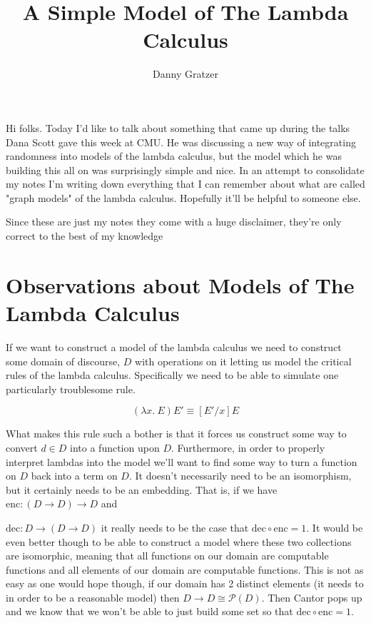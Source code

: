 \documentclass{amsart}
\title{A Simple Model of The Lambda Calculus}
\author{Danny Gratzer}
\newcommand{\enc}{\text{enc}}
\newcommand{\dec}{\text{dec}}
\begin{document}
\maketitle


Hi folks. Today I'd like to talk about something that came up during
the talks Dana Scott gave this week at CMU. He was discussing a new
way of integrating randomness into models of the lambda calculus, but
the model which he was building this all on was surprisingly simple
and nice. In an attempt to consolidate my notes I'm writing down
everything that I can remember about what are called "graph models" of
the lambda calculus. Hopefully it'll be helpful to someone
else.

Since these are just my notes they come with a huge disclaimer,
they're only correct to the best of my knowledge

\section{Observations about Models of The Lambda Calculus}

If we want to construct a model of the lambda calculus we need to
construct some domain of discourse, $D$ with operations on it letting
us model the critical rules of the lambda calculus. Specifically we
need to be able to simulate one particularly troublesome rule.

\[
    (\lambda x.\ E)E' \equiv [E'/x]E
\]

What makes this rule such a bother is that it forces us construct some
way to convert $d \in D$ into a function upon $D$. Furthermore, in
order to properly interpret lambdas into the model we'll want to find
some way to turn a function on $D$ back into a term on $D$. It
doesn't necessarily need to be an isomorphism, but it certainly needs
to be an embedding. That is, if we have $\enc : (D \to D) \to D$ and

$\dec : D \to (D \to D)$ it really needs to be the case that
$\dec \circ \enc = 1$. It would be even better though to be able to
construct a model where these two collections are isomorphic, meaning
that all functions on our domain are computable functions and all
elements of our domain are computable functions. This is not as easy
as one would hope though, if our domain has 2 distinct elements (it
needs to in order to be a reasonable model) then
$D \to D \cong \mathcal{P}(D)$. Then Cantor pops up and we know that
we won't be able to just build some set so that $\dec \circ \enc = 1$.
\end{document}

